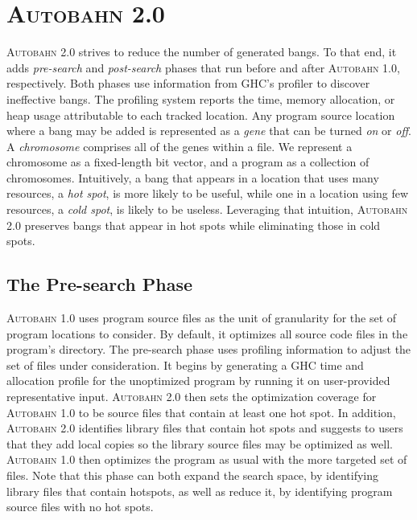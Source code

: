 \documentclass[sigplan,screen]{acmart}
\newcommand{\hotspot}[0]{hot spot}
\newcommand{\hotspots}[0]{hot spots}
\newcommand{\coldspot}[0]{cold spot}
\newcommand{\coldspots}[0]{cold spots}
\newcommand{\useful}[0]{useful}
\newcommand{\useless}[0]{useless}
\newcommand{\Ao}[0]{\textsc{Autobahn 1.0}}
\newcommand{\At}[0]{\textsc{Autobahn 2.0}}
\newcommand{\preopt}[0]{pre-search}
\newcommand{\postopt}[0]{post-search}
\newcommand{\Preopt}[0]{Pre-search}
\begin{document}
\section{\At{}}

\At{} strives
to reduce the number of generated bangs. 
To that end,
it adds \textit{\preopt{}} and
\textit{\postopt{}} phases that run before and after \Ao{},
respectively.  Both phases use information from GHC's profiler to discover
ineffective bangs. 
The profiling system reports the time,
memory allocation, or heap usage attributable to each
tracked location.
Any program source location where a bang may be added is
represented as a \textit{gene} that can be turned \textit{on}
or \textit{off}.
A \textit{chromosome} comprises all
of the genes within a file. We represent a chromosome as a
fixed-length bit vector, and a program as a collection of chromosomes.
Intuitively, a bang that appears in a location that uses many resources, 
a \textit{\hotspot}, is more likely to be \useful{}, while one in a
location using few resources, a \textit{\coldspot}, is likely to
be \useless{}.  Leveraging that intuition, \At{} preserves bangs that appear
in \hotspots{} while eliminating those in \coldspots{}.

\subsection{The \Preopt{} Phase}
 \Ao{} uses program source files as the unit of granularity for 
the set of program locations to consider. By
default, it optimizes all source code files in the program's
directory. The \preopt{} phase uses profiling information to adjust
the set of files under consideration. 
It begins by generating a GHC time
and allocation profile for the unoptimized program by running it on 
user-provided representative input.
\At{} then sets the optimization coverage
for \Ao{} to be source files that contain at least one \hotspot{}. 
In addition, 
\At{} identifies library files that contain \hotspots{} and
suggests to users that they add local copies so the library source
files may be optimized as well. 
\Ao{} then optimizes the program as usual with the more
targeted set of files.
Note that this phase can both expand the search space, by identifying
library files that contain hotspots, as well as reduce it, by
identifying program source files with no \hotspots{}. 
\end{document}
